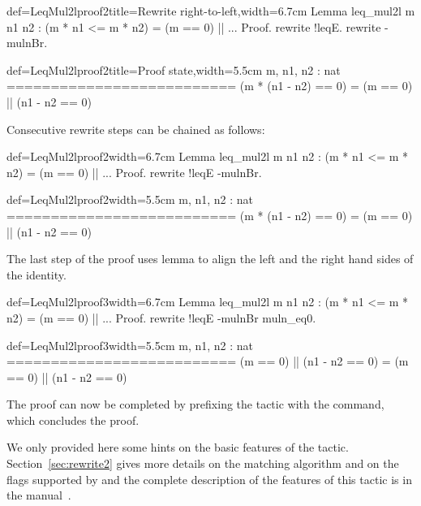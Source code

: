 \begin{coq}{def=LeqMul2lproof2}{title=Rewrite right-to-left,width=6.7cm}
Lemma leq_mul2l m n1 n2 :
 (m * n1 <= m * n2) = (m == 0) || ...
Proof.
rewrite !leqE. rewrite -mulnBr.
\end{coq}
\begin{coqout}{def=LeqMul2lproof2}{title=Proof state,width=5.5cm}
m, n1, n2 : nat
==========================
(m * (n1 - n2) == 0) =
  (m == 0) || (n1 - n2 == 0)
\end{coqout}
Consecutive rewrite steps can be chained as follows:

\begin{coq}{def=LeqMul2lproof2}{width=6.7cm}
Lemma leq_mul2l m n1 n2 :
 (m * n1 <= m * n2) = (m == 0) || ...
Proof.
rewrite !leqE -mulnBr.
\end{coq}
\begin{coqout}{def=LeqMul2lproof2}{width=5.5cm}
m, n1, n2 : nat
==========================
(m * (n1 - n2) == 0) =
  (m == 0) || (n1 - n2 == 0)
\end{coqout}
The last step of the proof uses lemma  to align the left
and the right hand sides of the identity.

\begin{coq}{def=LeqMul2lproof3}{width=6.7cm}
Lemma leq_mul2l m n1 n2 :
 (m * n1 <= m * n2) = (m == 0) || ...
Proof.
rewrite !leqE -mulnBr muln_eq0.
\end{coq}
\begin{coqout}{def=LeqMul2lproof3}{width=5.5cm}
m, n1, n2 : nat
==========================
(m == 0) || (n1 - n2 == 0) =
  (m == 0) || (n1 - n2 == 0)
\end{coqout}

The proof can now be completed by prefixing the tactic with the
 command, which concludes the proof.

We only provided here some hints on the basic features of the 
tactic. Section~\ref{sec:rewrite2} gives more details on the matching
algorithm and on the flags supported by  and the complete
description of the features of this tactic is in the manual~\cite{ssrman}.



